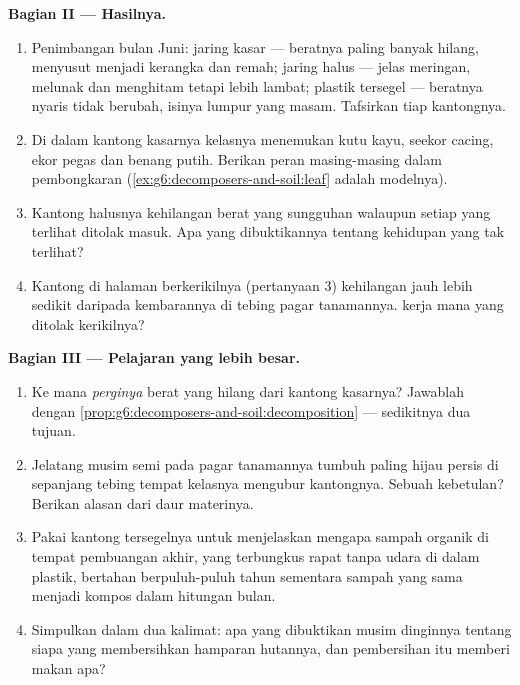 \begin{problem}
\medskip\noindent\textbf{Bagian II --- Hasilnya.}
\begin{enumerate}[resume]
  \item Penimbangan bulan Juni: jaring kasar --- beratnya paling
        banyak hilang,  menyusut menjadi kerangka dan remah;
        jaring halus --- jelas meringan,  melunak dan menghitam
        tetapi lebih lambat; plastik tersegel --- beratnya nyaris tidak
        berubah, isinya lumpur yang masam. Tafsirkan tiap kantongnya.
  \item Di dalam kantong kasarnya kelasnya menemukan kutu kayu, seekor
        cacing, ekor pegas dan benang  putih. Berikan peran
        masing-masing dalam pembongkaran 
        (\cref{ex:g6:decomposers-and-soil:leaf} adalah modelnya).
  \item Kantong halusnya kehilangan berat yang sungguhan walaupun
        setiap  yang terlihat ditolak masuk. Apa yang
        dibuktikannya tentang kehidupan  yang tak terlihat?
  \item Kantong di halaman berkerikilnya (pertanyaan 3) kehilangan
        jauh lebih sedikit daripada kembarannya di tebing pagar
        tanamannya.  kerja mana yang ditolak kerikilnya?
\end{enumerate}

\medskip\noindent\textbf{Bagian III --- Pelajaran yang lebih besar.}
\begin{enumerate}[resume]
  \item Ke mana \emph{perginya} berat yang hilang dari kantong
        kasarnya? Jawablah dengan
        \cref{prop:g6:decomposers-and-soil:decomposition}
        --- sedikitnya dua tujuan.
  \item Jelatang musim semi pada pagar tanamannya tumbuh paling hijau
        persis di sepanjang tebing tempat kelasnya mengubur
        kantongnya. Sebuah kebetulan? Berikan alasan dari daur
        materinya.
  \item Pakai kantong tersegelnya untuk menjelaskan mengapa sampah
        organik di tempat pembuangan akhir, yang terbungkus rapat
        tanpa udara di dalam plastik, bertahan berpuluh-puluh tahun
        sementara sampah yang sama menjadi kompos dalam hitungan
        bulan.
  \item Simpulkan dalam dua kalimat: apa yang dibuktikan musim
        dinginnya tentang siapa yang membersihkan hamparan hutannya,
        dan pembersihan itu memberi makan apa?
\end{enumerate}
\end{problem}
